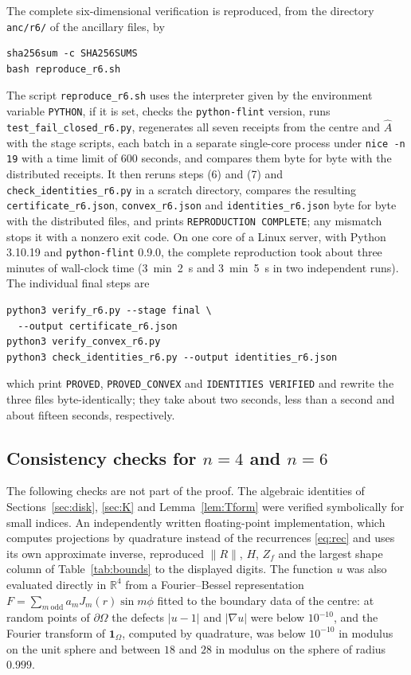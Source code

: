 \documentclass[11pt]{amsart}
\theoremstyle{definition}
\theoremstyle{remark}
\numberwithin{equation}{section}
\newcommand{\R}{\mathbb{R}}
\newcommand{\one}{\mathbf{1}}
\newcommand{\nrm}[1]{\lVert #1\rVert}
\begin{document}
The complete six-dimensional verification is reproduced, from the directory \texttt{anc/r6/} of the ancillary files, by
\begin{verbatim}
sha256sum -c SHA256SUMS
bash reproduce_r6.sh
\end{verbatim}
{\sloppy The script \texttt{reproduce\_r6.sh} uses the interpreter given by the environment variable \texttt{PYTHON}, if it is set, checks the \texttt{python-flint} version, runs \texttt{test\_fail\_closed\_r6.py}, regenerates all seven receipts from the centre and $\widehat A$ with the stage scripts, each batch in a separate single-core process under \texttt{nice -n 19} with a time limit of $600$ seconds, and compares them byte for byte with the distributed receipts. It then reruns steps (6) and (7) and \texttt{check\_identities\_r6.py} in a scratch directory, compares the resulting \texttt{certificate\_r6.json}, \texttt{convex\_r6.json} and \texttt{identities\_r6.json} byte for byte with the distributed files, and prints \texttt{REPRODUCTION COMPLETE}; any mismatch stops it with a nonzero exit code. On one core of a Linux server, with Python 3.10.19 and \texttt{python-flint} 0.9.0, the complete reproduction took about three minutes of wall-clock time (3~min~2~s and 3~min~5~s in two independent runs). The individual final steps are\par}
\begin{verbatim}
python3 verify_r6.py --stage final \
  --output certificate_r6.json
python3 verify_convex_r6.py
python3 check_identities_r6.py --output identities_r6.json
\end{verbatim}
which print \texttt{PROVED}, \texttt{PROVED\_CONVEX} and \texttt{IDENTITIES VERIFIED} and rewrite the three files byte-identically; they take about two seconds, less than a second and about fifteen seconds, respectively.

\subsection{Consistency checks for $n=4$ and $n=6$}
The following checks are not part of the proof. The algebraic identities of Sections~\ref{sec:disk}, \ref{sec:K} and Lemma~\ref{lem:Tform} were verified symbolically for small indices. An independently written floating-point implementation, which computes projections by quadrature instead of the recurrences \eqref{eq:rec} and uses its own approximate inverse, reproduced $\nrm R$, $H$, $Z_f$ and the largest shape column of Table~\ref{tab:bounds} to the displayed digits. The function $u$ was also evaluated directly in $\R^4$ from a Fourier--Bessel representation $F=\sum_{m\ \mathrm{odd}}a_mJ_m(r)\sin m\phi$ fitted to the boundary data of the centre: at random points of $\partial\Omega$ the defects $|u-1|$ and $|\nabla u|$ were below $10^{-10}$, and the Fourier transform of $\one_\Omega$, computed by quadrature, was below $10^{-10}$ in modulus on the unit sphere and between $18$ and $28$ in modulus on the sphere of radius $0.999$.
\end{document}
